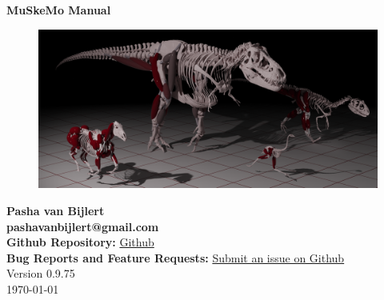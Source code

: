 \documentclass{article}
\begin{document}












\begin{center}
    {\huge \textbf{MuSkeMo Manual}}\\[20pt]  %
    \vspace{10pt}  %

    \begin{figure}[h]
        \centering
        \includegraphics[width=\textwidth]{figures/cover_pic.png} %
    \end{figure}
    \setcounter{figure}{0}
    \vspace{20pt} %
    
    {\Large \textbf{Pasha van Bijlert}}\\
    \vspace{10pt}
    \textbf{pashavanbijlert@gmail.com}\\
    \textbf{Github Repository:} \href{https://github.com/PashavanBijlert/MuSkeMo}{Github} \\
    \textbf{Bug Reports and Feature Requests:} \href{https://github.com/PashavanBijlert/MuSkeMo/issues}{Submit an issue on Github} \\
    \vspace{20pt}
    {\large Version 0.9.75} \\
    {\large \today}
\end{center}
\end{document}
